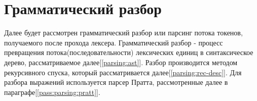 












\clearpage
\section{Грамматический разбор}
\label{pass:parsing}

Далее будет рассмотрен грамматический разбор или парсинг потока токенов, получаемого после прохода лексера.
Грамматический разбор - процесс превращения потока(последовательности) лексических единиц в синтаксическое дерево, рассматриваемое далее[\ref{parsing:ast}].
Разбор производится методом рекурсивного спуска, который рассматривается далее[\ref{parsing:rec-desc}]. Для разбора выражений используется парсер Пратта, рассмотренные далее в параграфе[\ref{pass:parsing:pratt}].

